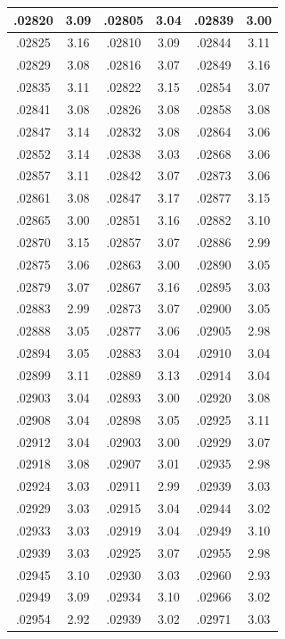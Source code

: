 \documentclass[10pt,twoside]{report}
\begin{document}
\begin{appendices}
\begin{longtable}{|c|c||c|c||c|c|}
.02820 & 3.09 & .02805 & 3.04 & .02839 & 3.00\\\hline
.02825 & 3.16 & .02810 & 3.09 & .02844 & 3.11\\\hline
.02829 & 3.08 & .02816 & 3.07 & .02849 & 3.16\\\hline
.02835 & 3.11 & .02822 & 3.15 & .02854 & 3.07\\\hline
.02841 & 3.08 & .02826 & 3.08 & .02858 & 3.08\\\hline
.02847 & 3.14 & .02832 & 3.08 & .02864 & 3.06\\\hline
.02852 & 3.14 & .02838 & 3.03 & .02868 & 3.06\\\hline
.02857 & 3.11 & .02842 & 3.07 & .02873 & 3.06\\\hline
.02861 & 3.08 & .02847 & 3.17 & .02877 & 3.15\\\hline
.02865 & 3.00 & .02851 & 3.16 & .02882 & 3.10\\\hline
.02870 & 3.15 & .02857 & 3.07 & .02886 & 2.99\\\hline
.02875 & 3.06 & .02863 & 3.00 & .02890 & 3.05\\\hline
.02879 & 3.07 & .02867 & 3.16 & .02895 & 3.03\\\hline
.02883 & 2.99 & .02873 & 3.07 & .02900 & 3.05\\\hline
.02888 & 3.05 & .02877 & 3.06 & .02905 & 2.98\\\hline
.02894 & 3.05 & .02883 & 3.04 & .02910 & 3.04\\\hline
.02899 & 3.11 & .02889 & 3.13 & .02914 & 3.04\\\hline
.02903 & 3.04 & .02893 & 3.00 & .02920 & 3.08\\\hline
.02908 & 3.04 & .02898 & 3.05 & .02925 & 3.11\\\hline
.02912 & 3.04 & .02903 & 3.00 & .02929 & 3.07\\\hline
.02918 & 3.08 & .02907 & 3.01 & .02935 & 2.98\\\hline
.02924 & 3.03 & .02911 & 2.99 & .02939 & 3.03\\\hline
.02929 & 3.03 & .02915 & 3.04 & .02944 & 3.02\\\hline
.02933 & 3.03 & .02919 & 3.04 & .02949 & 3.10\\\hline
.02939 & 3.03 & .02925 & 3.07 & .02955 & 2.98\\\hline
.02945 & 3.10 & .02930 & 3.03 & .02960 & 2.93\\\hline
.02949 & 3.09 & .02934 & 3.10 & .02966 & 3.02\\\hline
.02954 & 2.92 & .02939 & 3.02 & .02971 & 3.03\\\hline

\end{longtable}
\end{appendices}
\end{document}
